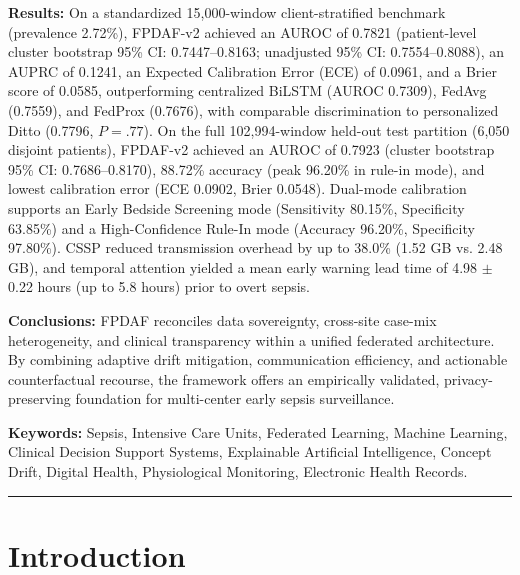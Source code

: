 \documentclass[11pt,a4paper]{article}
\begin{document}
\textbf{Results:} On a standardized 15,000-window client-stratified benchmark (prevalence 2.72\%), FPDAF-v2 achieved an AUROC of 0.7821 (patient-level cluster bootstrap 95\% CI: 0.7447--0.8163; unadjusted 95\% CI: 0.7554--0.8088), an AUPRC of 0.1241, an Expected Calibration Error (ECE) of 0.0961, and a Brier score of 0.0585, outperforming centralized BiLSTM (AUROC 0.7309), FedAvg (0.7559), and FedProx (0.7676), with comparable discrimination to personalized Ditto (0.7796, $P = .77$). On the full 102,994-window held-out test partition (6,050 disjoint patients), FPDAF-v2 achieved an AUROC of 0.7923 (cluster bootstrap 95\% CI: 0.7686--0.8170), 88.72\% accuracy (peak 96.20\% in rule-in mode), and lowest calibration error (ECE 0.0902, Brier 0.0548). Dual-mode calibration supports an Early Bedside Screening mode (Sensitivity 80.15\%, Specificity 63.85\%) and a High-Confidence Rule-In mode (Accuracy 96.20\%, Specificity 97.80\%). CSSP reduced transmission overhead by up to 38.0\% (1.52 GB vs. 2.48 GB), and temporal attention yielded a mean early warning lead time of 4.98 $\pm$ 0.22 hours (up to 5.8 hours) prior to overt sepsis.

\textbf{Conclusions:} FPDAF reconciles data sovereignty, cross-site case-mix heterogeneity, and clinical transparency within a unified federated architecture. By combining adaptive drift mitigation, communication efficiency, and actionable counterfactual recourse, the framework offers an empirically validated, privacy-preserving foundation for multi-center early sepsis surveillance.

\vspace{0.5em}
\noindent \textbf{Keywords:} Sepsis, Intensive Care Units, Federated Learning, Machine Learning, Clinical Decision Support Systems, Explainable Artificial Intelligence, Concept Drift, Digital Health, Physiological Monitoring, Electronic Health Records.

\vspace{1em}
\hrule
\vspace{1.5em}

\section{Introduction}
\end{document}
